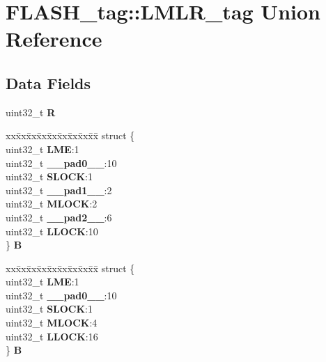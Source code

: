 \hypertarget{unionFLASH__tag_1_1LMLR__tag}{}\section{F\+L\+A\+S\+H\+\_\+tag\+::L\+M\+L\+R\+\_\+tag Union Reference}
\label{unionFLASH__tag_1_1LMLR__tag}
\subsection*{Data Fields}
\begin{DoxyCompactItemize}
\item 
\mbox{\label{unionFLASH__tag_1_1LMLR__tag_add609466ef581581acc4a2b2d84c9af0}} 
uint32\+\_\+t {\bfseries R}
\item 
\mbox{\label{unionFLASH__tag_1_1LMLR__tag_ae9ccc5ff750cd4274e9166d29bf95ba9}} 
\begin{tabbing}
xx\=xx\=xx\=xx\=xx\=xx\=xx\=xx\=xx\=\kill
struct \{\\
\>uint32\_t {\bfseries LME}:1\\
\>uint32\_t {\bfseries \_\_pad0\_\_}:10\\
\>uint32\_t {\bfseries SLOCK}:1\\
\>uint32\_t {\bfseries \_\_pad1\_\_}:2\\
\>uint32\_t {\bfseries MLOCK}:2\\
\>uint32\_t {\bfseries \_\_pad2\_\_}:6\\
\>uint32\_t {\bfseries LLOCK}:10\\
\} {\bfseries B}\\

\end{tabbing}\item 
\mbox{\label{unionFLASH__tag_1_1LMLR__tag_a76c3effe51f3658ab0a661019df8e8d6}} 
\begin{tabbing}
xx\=xx\=xx\=xx\=xx\=xx\=xx\=xx\=xx\=\kill
struct \{\\
\>uint32\_t {\bfseries LME}:1\\
\>uint32\_t {\bfseries \_\_pad0\_\_}:10\\
\>uint32\_t {\bfseries SLOCK}:1\\
\>uint32\_t {\bfseries MLOCK}:4\\
\>uint32\_t {\bfseries LLOCK}:16\\
\} {\bfseries B}\\


\end{tabbing}
\end{DoxyCompactItemize}
